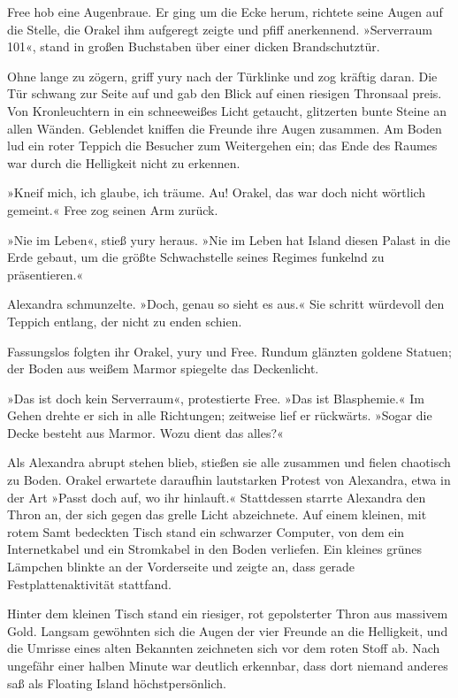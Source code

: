 Free hob eine Augenbraue. Er ging um die Ecke herum, richtete seine Augen auf die Stelle, die Orakel ihm aufgeregt zeigte und pfiff anerkennend. »Serverraum 101«, stand in großen Buchstaben über einer dicken Brandschutztür.

Ohne lange zu zögern, griff yury nach der Türklinke und zog kräftig daran. Die Tür schwang zur Seite auf und gab den Blick auf einen riesigen Thronsaal preis. Von Kronleuchtern in ein schneeweißes Licht getaucht, glitzerten bunte Steine an allen Wänden. Geblendet kniffen die Freunde ihre Augen zusammen. Am Boden lud ein roter Teppich die Besucher zum Weitergehen ein; das Ende des Raumes war durch die Helligkeit nicht zu erkennen.

»Kneif mich, ich glaube, ich träume. Au! Orakel, das war doch nicht wörtlich gemeint.« Free zog seinen Arm zurück.

»Nie im Leben«, stieß yury heraus. »Nie im Leben hat Island diesen Palast in die Erde gebaut, um die größte Schwachstelle seines Regimes funkelnd zu präsentieren.«

Alexandra schmunzelte. »Doch, genau so sieht es aus.« Sie schritt würdevoll den Teppich entlang, der nicht zu enden schien.

Fassungslos folgten ihr Orakel, yury und Free. Rundum glänzten goldene Statuen; der Boden aus weißem Marmor spiegelte das Deckenlicht.

»Das ist doch kein Serverraum«, protestierte Free. »Das ist Blasphemie.« Im Gehen drehte er sich in alle Richtungen; zeitweise lief er rückwärts. »Sogar die Decke besteht aus Marmor. Wozu dient das alles?«

Als Alexandra abrupt stehen blieb, stießen sie alle zusammen und fielen chaotisch zu Boden. Orakel erwartete daraufhin lautstarken Protest von Alexandra, etwa in der Art »Passt doch auf, wo ihr hinlauft.« Stattdessen starrte Alexandra den Thron an, der sich gegen das grelle Licht abzeichnete. Auf einem kleinen, mit rotem Samt bedeckten Tisch stand ein schwarzer Computer, von dem ein Internetkabel und ein Stromkabel in den Boden verliefen. Ein kleines grünes Lämpchen blinkte an der Vorderseite und zeigte an, dass gerade Festplattenaktivität stattfand.

Hinter dem kleinen Tisch stand ein riesiger, rot gepolsterter Thron aus massivem Gold. Langsam gewöhnten sich die Augen der vier Freunde an die Helligkeit, und die Umrisse eines alten Bekannten zeichneten sich vor dem roten Stoff ab. Nach ungefähr einer halben Minute war deutlich erkennbar, dass dort niemand anderes saß als Floating Island höchstpersönlich.

